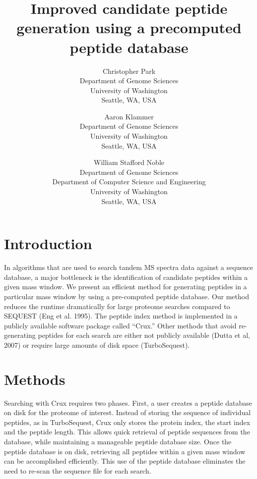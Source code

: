 \documentclass[12pt]{article}
\begin{document}
\title{Improved candidate peptide generation using a precomputed
peptide database}

\author{
Christopher Park\\
Department of Genome Sciences\\
University of Washington\\
Seattle, WA, USA
\and
Aaron Klammer\\
Department of Genome Sciences\\
University of Washington\\
Seattle, WA, USA
\and
William Stafford Noble\\
Department of Genome Sciences\\
Department of Computer Science and Engineering\\
University of Washington\\
Seattle, WA, USA
}

\maketitle

\section{Introduction}

In algorithms that are used to search tandem MS spectra data against a
sequence database, a major bottleneck is the identification of
candidate peptides within a given mass window. We present an efficient
method for generating peptides in a particular mass window by using a
pre-computed peptide database. Our method reduces the runtime
dramatically for large proteome searches compared to SEQUEST (Eng et
al. 1995).  The peptide index method is implemented in a publicly available software
package called ``Crux.''  Other methods that avoid re-generating
peptides for each search are either not publicly available (Dutta et
al, 2007) or require large amounts of disk space (TurboSequest).

\section{Methods}

Searching with Crux requires two phases.  First, a user creates a
peptide database on disk for the proteome of interest.  Instead of
storing the sequence of individual peptides, as in TurboSequest, 
Crux only stores the protein index, the start
index and the peptide length.  This allows quick retrieval of peptide
sequences from the database, while maintaining a manageable peptide
database size.  Once the peptide database is on disk, retrieving all
peptides within a given mass window can be accomplished efficiently.
This use of the peptide database eliminates the need to re-scan the
sequence file for each search.
\end{document}

